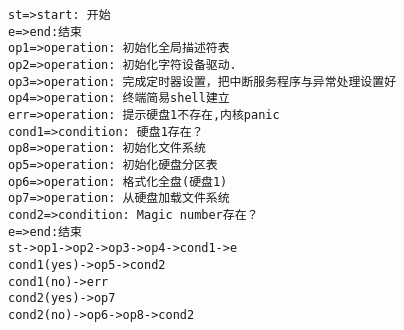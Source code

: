 \documentclass[]{article}
\date{}
\begin{document}
\begin{verbatim}
st=>start: 开始
e=>end:结束
op1=>operation: 初始化全局描述符表
op2=>operation: 初始化字符设备驱动.
op3=>operation: 完成定时器设置，把中断服务程序与异常处理设置好
op4=>operation: 终端简易shell建立
err=>operation: 提示硬盘1不存在,内核panic
cond1=>condition: 硬盘1存在？
op8=>operation: 初始化文件系统
op5=>operation: 初始化硬盘分区表
op6=>operation: 格式化全盘(硬盘1)
op7=>operation: 从硬盘加载文件系统
cond2=>condition: Magic number存在？
e=>end:结束
st->op1->op2->op3->op4->cond1->e
cond1(yes)->op5->cond2
cond1(no)->err
cond2(yes)->op7
cond2(no)->op6->op8->cond2
\end{verbatim}
\end{document}

